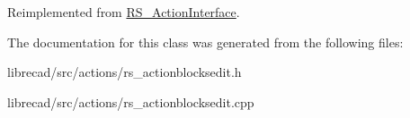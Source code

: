 Reimplemented from \hyperlink{classRS__ActionInterface_aa2ba8f6f697f735eace4ec5449c0b8cd}{R\-S\-\_\-\-Action\-Interface}.



The documentation for this class was generated from the following files\-:\begin{DoxyCompactItemize}
\item 
librecad/src/actions/rs\-\_\-actionblocksedit.\-h\item 
librecad/src/actions/rs\-\_\-actionblocksedit.\-cpp\end{DoxyCompactItemize}
